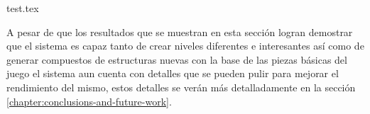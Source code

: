 {test.tex}

A pesar de que los resultados que se muestran en esta sección logran demostrar
que el sistema es capaz tanto de crear niveles diferentes e interesantes así
como de generar compuestos de estructuras nuevas con la base de las piezas
básicas del juego el sistema aun cuenta con detalles que se pueden pulir para
mejorar el rendimiento del mismo, estos detalles se verán más detalladamente en
la sección \ref{chapter:conclusions-and-future-work}.
